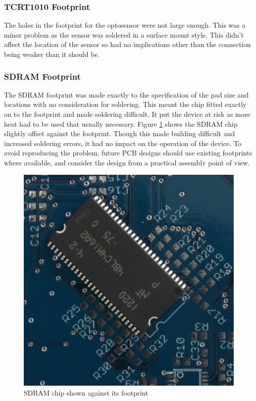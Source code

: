 \subsubsection{TCRT1010 Footprint}
The holes in the footprint for the optosensor were not large enough. This was a minor problem as the sensor was soldered in a surface mount style. This didn't affect the location of the sensor so had no implications other than the connection being weaker than it should be. 

\subsubsection{SDRAM Footprint}
The SDRAM footprint was made exactly to the specification of the pad size and locations with no consideration for soldering. This meant the chip fitted exactly on to the footprint and made soldering difficult.%
It put the device at risk as more heat had to be used that usually necessary. Figure \ref{fig:SDRAM_Err} shows the SDRAM chip slightly offset against the footprint. 
Though this made building difficult and increased soldering errors, it had no impact on the operation of the device. To avoid reproducing the problem, future PCB designs should use existing footprints where available, and consider the design from a practical assembly point of view.

\begin{figure}
\centering
\includegraphics[width=\textwidth / 2]{./Figures/PCB_SDRAM.jpg}
\caption{SDRAM chip shown against its footprint}
\label{fig:SDRAM_Err}
\end{figure}


